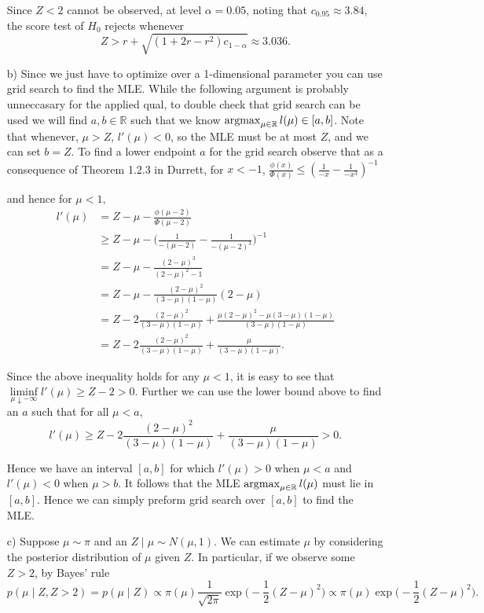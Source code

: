 \begin{enumerate}
Since $Z< 2$ cannot be observed, at level $\alpha=0.05$, noting that $c_{0.95} \approx 3.84$, the score test of $H_0$ rejects whenever $$Z > r+ \sqrt{(1+2r-r^2) c_{1-\alpha}} \approx 3.036.$$


\item[b)] Since we just have to optimize over a 1-dimensional parameter you can use grid search to find the MLE. While the following argument is probably unneccasary for the applied qual, to double check that grid search can be used we will find $a, b \in \mathbb{R}$ such that we know $\operatorname*{argmax}_{\mu \in \mathbb{R}} l(\mu) \in [a,b]$. Note that whenever, $\mu > Z$, $l'(\mu) <0$, so the MLE must be at most $Z$, and we can set $b=Z$. To find a lower endpoint $a$ for the grid search observe that as a consequence of Theorem 1.2.3 in Durrett, for $x<-1$, $\frac{\phi(x)}{\Phi(x)} \leq (\frac{1}{-x} -\frac{1}{-x^3} )^{-1}$

and hence for $\mu < 1$,
$$\begin{aligned}
l'(\mu) & = Z - \mu - \frac{\phi(\mu-2)}{\Phi(\mu -2)}
\\ & \geq Z - \mu -  \Big(\frac{1}{-(\mu-2)} -\frac{1}{-(\mu-2)^3} \Big)^{-1}
\\ & = Z - \mu - \frac{(2-\mu)^3}{(2-\mu)^2 -1 }
\\ & = Z - \mu - \frac{(2-\mu)^2}{(3-\mu) (1-\mu) } (2-\mu)
\\ & = Z -2 \frac{(2-\mu)^2}{(3 -\mu) (1-\mu)} + \frac{\mu(2-\mu)^2 -\mu (3-\mu) (1-\mu)}{ (3-\mu) (1-\mu)}
\\ & = Z -2 \frac{(2-\mu)^2}{(3 -\mu) (1-\mu)} + \frac{\mu }{ (3-\mu) (1-\mu)}.
\end{aligned}$$

Since the above inequality holds for any $\mu < 1$, it is easy to see that $\liminf\limits_{\mu \downarrow - \infty} l'(\mu) \geq Z-2 >0$. Further we can use the lower bound above to find an $a$ such that for all $\mu < a$, $$ l'(\mu) \geq Z -2 \frac{(2-\mu)^2}{(3 -\mu) (1-\mu)} + \frac{\mu }{ (3-\mu) (1-\mu)} >0.$$

Hence we have an interval $[a,b]$ for which $l'(\mu) >0$ when $\mu <a$ and $l'(\mu) <0$ when $\mu>b$. It follows that the MLE $\operatorname*{argmax}_{\mu \in \mathbb{R}} l(\mu)$ must lie in $[a,b]$. Hence we can simply preform grid search over $[a,b]$ to find the MLE.

\item[c)] Suppose $\mu \sim \pi$ and an $Z \mid \mu  \sim N(\mu,1)$.
We can estimate $\mu$ by considering the posterior distribution of $\mu$ given $Z$. In particular, if we observe some $Z >2$, by Bayes' rule $$p(\mu \mid Z, Z>2 ) = p(\mu \mid Z) \propto \pi(\mu) \frac{1}{\sqrt{2 \pi}} \exp \big( -\frac{1}{2} (Z-\mu)^2 \big) \propto  \pi(\mu)  \exp \big( -\frac{1}{2} (Z-\mu)^2 \big).$$


\end{enumerate}
